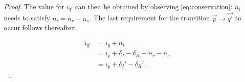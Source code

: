 \begin{proof}
The value for $i_{q'}$ can then be obtained by observing \eqref{eq:conservation}: $n_i$ needs to satisfy $n_i=n_r-n_s$. The last requirement for the transition $\vec{p} \rightarrow \vec{q'}$ to occur follows thereafter:

\begin{equation*}
\begin{split}
i_{q'}&=i_q+n_i \\
&=i_p+\delta_I-\delta_R+n_r-n_s \\
&=i_p+\delta_I'-\delta_R'.
\end{split}
\end{equation*}



\end{proof}


